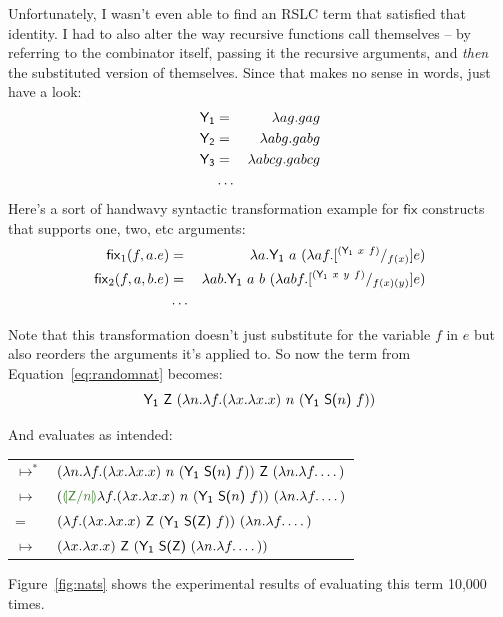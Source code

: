 \documentclass[10pt]{sigplanconf}
\begin{document}
Unfortunately, I wasn't even able to find an RSLC term that satisfied that identity. I had to also alter the way recursive functions call themselves -- by referring to the combinator itself, passing it the recursive arguments, and {\em then} the substituted version of themselves. Since that makes no sense in words, just have a look:
\begin{eqnarray*}
\mathsf{Y_1} &=& \lambda ag. gag \\
\mathsf{Y_2} &=& \lambda abg. gabg \\
\mathsf{Y_3} &=& \lambda abcg. gabcg \\
&\dots&
\end{eqnarray*}
Here's a sort of handwavy syntactic transformation example for $\mathsf{fix}$ constructs that supports one, two, etc arguments:
\begin{eqnarray*}
\mathsf{fix}_1(f,a.e) &=& \lambda a. \mathsf{Y_1}~a~(\lambda af. [^{(\mathsf{Y_1}~x~f)}/_{f(x)}]e) \\
\mathsf{fix}_2(f,a,b.e) &=& \lambda ab. \mathsf{Y_1}~a~b~(\lambda abf. [^{(\mathsf{Y_1}~x~y~f)}/_{f(x)(y)}]e) \\
&\dots&
\end{eqnarray*}

Note that this transformation doesn't just substitute for the variable $f$ in $e$ but also reorders the arguments it's applied to. So now the term from Equation~\ref{eq:randomnat} becomes:
\begin{equation}
\label{eq:randomnat-fixed}
\mathsf{Y_1}~\textsf{Z}~(\lambda n. \lambda f. (\lambda x. \lambda x. x)~n~(\mathsf{Y_1}~\textsf{S(}n\textsf{)}~f))
\end{equation}

And evaluates as intended:

\begin{center}
\begin{tabular}{ll}
$\mapsto^*$ & $(\lambda n. \lambda f. (\lambda x. \lambda x. x)~n~(\mathsf{Y_1}~\textsf{S(}n\textsf{)}~f))~\textsf{Z}~(\lambda n. \lambda f. \dots)$ \\
$\mapsto$ & $(\subst{\Zero}{n}\lambda f. (\lambda x. \lambda x. x)~n~(\Ya~\Suc{n}~f))~(\lambda n. \lambda f. \dots)$ \\
= & $(\lambda f. (\lambda x. \lambda x. x)~\textsf{Z}~(\mathsf{Y_1}~\textsf{S(}\textsf{Z}\textsf{)}~f))~(\lambda n. \lambda f. \dots)$ \\
$\mapsto$ & $(\lambda x. \lambda x. x)~\textsf{Z}~(\mathsf{Y_1}~\textsf{S(}\textsf{Z}\textsf{)}~(\lambda n. \lambda f. \dots))$
\end{tabular}
\end{center}

Figure~\ref{fig:nats} shows the experimental results of evaluating this term 10,000 times.
\end{document}
